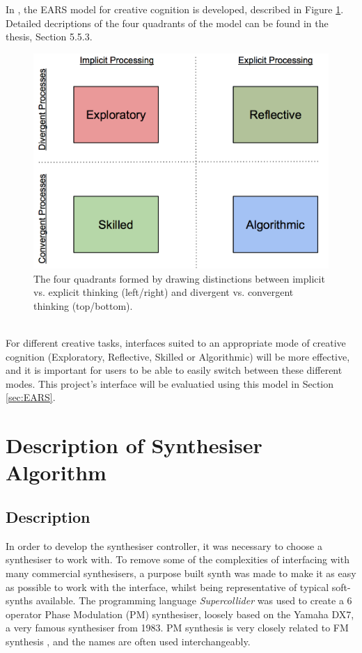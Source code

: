 \documentclass[11pt, oneside]{report}   	%
\begin{document}
In \cite{TubbThesis}, the EARS model for creative cognition is developed, described in Figure \ref{fig:EARSmodel}. Detailed decriptions of the four quadrants of the model can be found in the thesis, Section 5.5.3.
\begin{figure}[h] 
	\centering
	\includegraphics[width = 5in]{EARSmodel.png}
	\caption{The four quadrants formed by drawing distinctions between implicit vs. explicit thinking (left/right) and divergent vs. convergent thinking (top/bottom). \cite{TubbThesis}}
	\label{fig:EARSmodel}
\end{figure}\\
For different creative tasks, interfaces suited to an appropriate mode of creative cognition (Exploratory, Reflective, Skilled or Algorithmic) will be more effective, and it is important for users to be able to easily switch between these different modes. This project's interface will be evaluatied using this model in Section \ref{sec:EARS}.


\chapter{Description of Synthesiser Algorithm}
\section{Description}
 In order to develop the synthesiser controller, it was necessary to choose a synthesiser to work with. To remove some of the complexities of interfacing with many commercial synthesisers, a purpose built synth was made to make it as easy as possible to work with the interface, whilst being representative of typical soft-synths available.
The programming language \emph{Supercollider} was used to create a 6 operator Phase Modulation (PM) synthesiser, loosely based on the Yamaha DX7, a very famous synthesiser from 1983. PM synthesis is very closely related to FM synthesis \cite{FM}, and the names are often used interchangeably.
 
\end{document}
